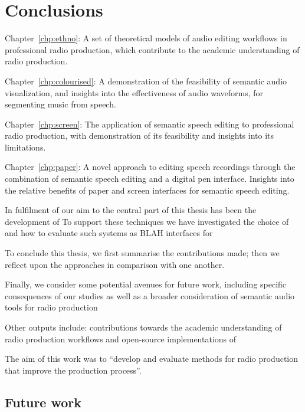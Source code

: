 \chapter{Conclusions}\label{chp:conclusions}


Chapter~\ref{chp:ethno}: A set of theoretical models of audio editing workflows in professional radio production, which
contribute to the academic understanding of radio production.

Chapter~\ref{chp:colourised}: A demonstration of the feasibility of semantic audio visualization, and insights into the
effectiveness of audio waveforms, for segmenting music from speech.

Chapter~\ref{chp:screen}: The application of semantic speech editing to professional radio production, with
demonstration of its feasibility and insights into its limitations. 

Chapter~\ref{chp:paper}: A novel approach to editing speech recordings through the combination of semantic speech
editing and a digital pen interface. Insights into the relative benefits of paper and screen interfaces for semantic
speech editing.


In fulfilment of our aim to
the central part of this thesis has been the development of
To support these techniques we have investigated the choice of
and how to evaluate such systems as BLAH interfaces for 

To conclude this thesis, we first summarise the contributions made; then we reflect upon the approaches in comparison
with one another.

Finally, we consider some potential avenues for future work, including specific consequences of our studies as well as
a broader consideration of semantic audio tools for radio production





Other outputs include: contributions towards the academic understanding of radio production workflows
and open-source implementations of



The aim of this work was to ``develop and evaluate methods for radio production that improve the production process''.





\section{Future work}

